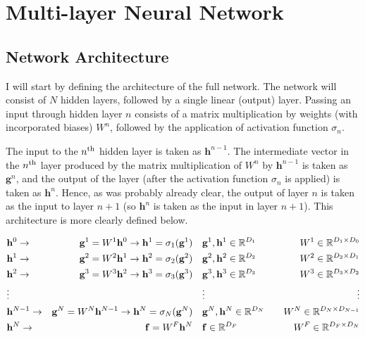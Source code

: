 \documentclass{article}
\begin{document}
\newpage

\section{Multi-layer Neural Network}
\label{sec:multi}

\subsection{Network Architecture}
\label{sec:arch}

I will start by defining the architecture of the full network. The network will consist of $N$ hidden layers, followed by a single linear (output) layer. Passing an input through hidden layer $n$ consists of a matrix multiplication by weights (with incorporated biases) $W^n$, followed by the application of activation function $\sigma_n$.

\vspace{1em}
The input to the $n\textsuperscript{th}$ hidden layer is taken as $\mathbf{h}^{n-1}$. The intermediate vector in the $n\textsuperscript{th}$ layer produced by the matrix multiplication of $W^n$ by $\mathbf{h}^{n-1}$ is taken as $\mathbf{g}^n$, and the output of the layer (after the activation function $\sigma_n$ is applied) is taken as $\mathbf{h}^n$. Hence, as was probably already clear, the output of layer $n$ is taken as the input to layer $n + 1$ (so $\mathbf{h}^n$ is taken as the input in layer $n + 1$). This architecture is more clearly defined below.

\begin{align}
\label{proc:full_nn}
    &\mathbf{h}^0\rightarrow&\mathbf{g}^1 = W^1\mathbf{h}^0\rightarrow\mathbf{h}^1 = \sigma_1(\mathbf{g}^1)\quad&\mathbf{g}^1,\mathbf{h}^1\in\mathbb{R}^{D_1}\quad &W^1\in\mathbb{R}^{D_1\times D_0}\notag \\
    &\mathbf{h}^1\rightarrow&\mathbf{g}^2 = W^2\mathbf{h}^1\rightarrow\mathbf{h}^2 = \sigma_2(\mathbf{g}^2)\quad&\mathbf{g}^2,\mathbf{h}^2\in\mathbb{R}^{D_2}\quad &W^2\in\mathbb{R}^{D_2\times D_1}\notag \\
    &\mathbf{h}^2\rightarrow&\mathbf{g}^3 = W^3\mathbf{h}^2\rightarrow\mathbf{h}^3 = \sigma_3(\mathbf{g}^3)\quad&\mathbf{g}^3,\mathbf{h}^3\in\mathbb{R}^{D_3}\quad &W^3\in\mathbb{R}^{D_3\times D_2}\notag \\
    &\vdots&&\vdots&\vdots\notag \\
    &\mathbf{h}^{N-1}\rightarrow&\mathbf{g}^N = W^N\mathbf{h}^{N-1}\rightarrow\mathbf{h}^N = \sigma_N(\mathbf{g}^N)\quad&\mathbf{g}^N,\mathbf{h}^N\in\mathbb{R}^{D_N}\quad &W^N\in\mathbb{R}^{D_N\times D_{N-1}}\notag \\
    &\mathbf{h}^N\rightarrow&\mathbf{f} = W^F\mathbf{h}^N\quad&\mathbf{f}\in\mathbb{R}^{D_F}\quad &W^F\in\mathbb{R}^{D_F\times D_N}
\end{align}
\end{document}

